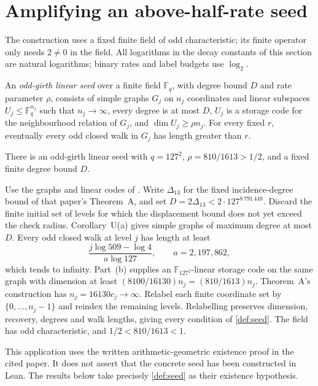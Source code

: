 \section{Amplifying an above-half-rate seed}\label{sec:amplification}

The construction uses a fixed finite field of odd characteristic; its
finite operator only needs $2\ne0$ in the field. All
logarithms in the decay constants of this section are natural logarithms;
binary rates and label budgets use $\log_2$.

\begin{definition}\label{def:seed}
An \emph{odd-girth linear seed} over a finite field $\mathbb F_q$, with
degree bound $D$ and rate parameter $\rho$, consists of simple graphs
$G_j$ on $n_j$ coordinates and linear subspaces
$U_j\le\mathbb F_q^{n_j}$ such that $n_j\to\infty$, every degree is at
most $D$, $U_j$ is a storage code for the neighbourhood relation of
$G_j$, and $\dim U_j\ge\rho n_j$. For every fixed $r$, eventually every
odd closed walk in $G_j$ has length greater than $r$.
\end{definition}

\begin{proposition}\label{prop:seed-exists}
\notformalized
There is an odd-girth linear seed with
$q=127^2$, $\rho=810/1613>1/2$, and a fixed finite degree bound $D$.
\end{proposition}
\begin{informalproof}
Use the graphs and linear codes of \cite[Corollary~U(a,b)]{PaperThirteen}.
Write $\Delta_{13}$ for the fixed incidence-degree bound of that paper's
Theorem~A, and set $D=2\Delta_{13}<2\cdot127^{8\,791\,448}$.
Discard the finite initial set of
levels for which the displacement bound does not yet exceed the check
radius. Corollary~U(a) gives simple graphs of maximum degree at most
$D$. Every odd closed walk at level $j$ has length at least
\[
 \frac{j\log509-\log4}{a\log127},\qquad a=2{,}197{,}862,
\]
which tends to infinity. Part~(b) supplies an $\mathbb F_{127^2}$-linear
storage code on the same graph with dimension at least
$(8100/16130)n_j=(810/1613)n_j$. Theorem~A's construction has
$n_j=16130c_j\to\infty$. Relabel each finite coordinate set by
$\{0,\ldots,n_j-1\}$ and reindex the remaining levels. Relabelling
preserves dimension, recovery, degrees and walk lengths, giving every
condition of \cref{def:seed}. The field has odd characteristic, and
$1/2<810/1613<1$.

This application uses the written arithmetic-geometric existence proof
in the cited paper. It does not assert that the concrete seed has been
constructed in Lean. The results below take precisely
\cref{def:seed} as their existence hypothesis.
\end{informalproof}

